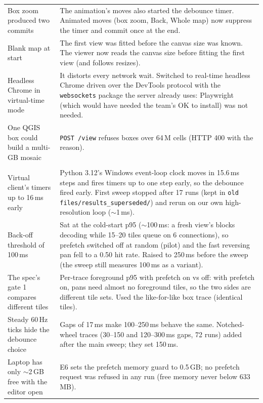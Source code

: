 ﻿\documentclass[11pt,a4paper]{article}
\newcommand{\code}[1]{\texttt{#1}}
\begin{document}
\begin{longtable}{>{\raggedright\arraybackslash}p{5.2cm}>{\raggedright\arraybackslash}p{10.2cm}}
Box zoom produced two commits & The animation's moves also started the debounce timer. Animated moves (box zoom, Back,
Whole map) now suppress the timer and commit once at the end. \\
Blank map at start & The first view was fitted before the canvas size was known. The viewer now reads the canvas size
before fitting the first view (and follows resizes). \\
Headless Chrome in virtual-time mode & It distorts every network wait. Switched to real-time headless Chrome driven over
the DevTools protocol with the \code{websockets} package the server already uses: Playwright (which would have needed the
team's OK to install) was not needed. \\
One QGIS box could build a multi-GB mosaic & \code{POST /view} refuses boxes over 64\,M cells (HTTP 400 with the
reason). \\
\midrule
\multicolumn{2}{l}{\textit{Phase 5: E6 (final plan Phase 5)}} \\
Virtual client's timers up to 16\,ms early & Python 3.12's Windows event-loop clock moves in 15.6\,ms steps and fires
timers up to one step early, so the debounce fired early. First sweep stopped after 17 runs (kept in \code{old
files/results\_superseded/}) and rerun on our own high-resolution loop ($\sim$1\,ms). \\
Back-off threshold of 100\,ms & Sat at the cold-start p95 ($\sim$100\,ms: a fresh view's blocks decoding while 15--20 tiles
queue on 6 connections), so prefetch switched off at random (pilot) and the fast reversing pan fell to a 0.50 hit rate.
Raised to 250\,ms before the sweep (the sweep still measures 100\,ms as a variant). \\
The spec's gate 1 compares different tiles & Per-trace foreground p95 with prefetch on vs off: with prefetch on, pans
need almost no foreground tiles, so the two sides are different tile sets. Used the like-for-like box trace (identical
tiles). \\
Steady 60\,Hz ticks hide the debounce choice & Gaps of 17\,ms make 100--250\,ms behave the same. Notched-wheel traces
(30--150 and 120--300\,ms gaps, 72 runs) added after the main sweep; they set 150\,ms. \\
Laptop has only $\sim$2\,GB free with the editor open & E6 sets the prefetch memory guard to 0.5\,GB; no prefetch request
was refused in any run (free memory never below 633\,MB). \\
\bottomrule
\end{longtable}
\end{document}
